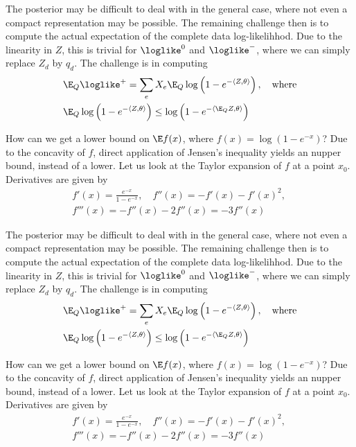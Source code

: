 The posterior may be difficult to deal with in the general case, where not even a compact representation may be possible. The remaining challenge then is to compute the actual expectation of the complete data log-likelihhod. Due to the linearity in $Z$, this is trivial for $\loglike^0$ and $\loglike^-$, where we can simply replace $Z_d$ by $q_d$. The challenge is in computing 
\begin{align}
& \E_Q \loglike^+ = \sum_{e} X_e \E_Q \log \left( 1 - e^{-\langle Z, \theta \rangle} \right), \quad \text{where}  \\
& \E_Q \log \left( 1 - e^{-\langle Z, \theta \rangle} \right) \le  \log \left( 1 - e^{-\langle \E_Q Z, \theta \rangle} \right) 
\end{align}

How can we get a lower bound on $\E f(x)$, where $f(x) = \log (1-e^{-x})$? Due to the concavity of $f$, direct application of Jensen's inequality yields an nupper bound, instead of a lower.  Let us look at the Taylor expansion of $f$ at a point $x_0$. Derivatives are given by 
\begin{align}
& f'(x) = \frac{e^{-x}}{1-e^{-x}}, \quad f''(x) = -f'(x) - f'(x)^2, \quad \\
& f'''(x) = -f''(x) - 2 f''(x) = - 3 f''(x) 
\end{align}





The posterior may be difficult to deal with in the general case, where not even a compact representation may be possible. The remaining challenge then is to compute the actual expectation of the complete data log-likelihhod. Due to the linearity in $Z$, this is trivial for $\loglike^0$ and $\loglike^-$, where we can simply replace $Z_d$ by $q_d$. The challenge is in computing 
\begin{align}
& \E_Q \loglike^+ = \sum_{e} X_e \E_Q \log \left( 1 - e^{-\langle Z, \theta \rangle} \right), \quad \text{where}  \\
& \E_Q \log \left( 1 - e^{-\langle Z, \theta \rangle} \right) \le  \log \left( 1 - e^{-\langle \E_Q Z, \theta \rangle} \right) 
\end{align}

How can we get a lower bound on $\E f(x)$, where $f(x) = \log (1-e^{-x})$? Due to the concavity of $f$, direct application of Jensen's inequality yields an nupper bound, instead of a lower.  Let us look at the Taylor expansion of $f$ at a point $x_0$. Derivatives are given by 
\begin{align}
& f'(x) = \frac{e^{-x}}{1-e^{-x}}, \quad f''(x) = -f'(x) - f'(x)^2, \quad \\
& f'''(x) = -f''(x) - 2 f''(x) = - 3 f''(x) 
\end{align}

